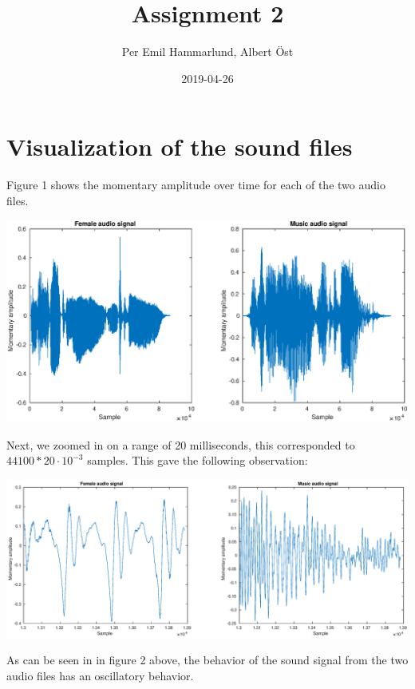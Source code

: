 \documentclass[]{article}
\title{Assignment 2}
\author{Per Emil Hammarlund, Albert Öst}
\date{2019-04-26}
\let\origfigure\figure
\let\endorigfigure\endfigure
\renewenvironment{figure}[1][2] {
    \expandafter\origfigure\expandafter[H]
} {
    \endorigfigure
}
\begin{document}
\maketitle

\section{Visualization of the sound
files}\label{visualization-of-the-sound-files}

Figure 1 shows the momentary amplitude over time for each of the two
audio files.

\begin{figure}
\centering
\includegraphics{Result_Pics/female_music_waveform.eps}
\caption{Momentary amplitude over time}
\end{figure}

Next, we zoomed in on a range of 20 milliseconds, this corresponded to
\(44100 * 20 \cdot 10^{-3}\) samples. This gave the following
observation:

\begin{figure}
\centering
\includegraphics{Result_Pics/female_music_waveform_20ms.eps}
\caption{Momentary amplitude in 20ms timeframe}
\end{figure}

As can be seen in in figure 2 above, the behavior of the sound signal
from the two audio files has an oscillatory behavior.
\end{document}

